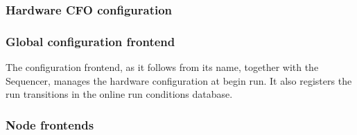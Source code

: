 \newpage
\subsubsection{Hardware CFO configuration}


% 

\subsubsection{Global configuration frontend}
\label{sec:conf_frontends}

The configuration frontend, as it follows from its name, together with the
Sequencer, manages the hardware configuration at begin run.
It also registers the run transitions in the online run conditions database.


\subsubsection{Node frontends}
\label{sec:node_frontends}

